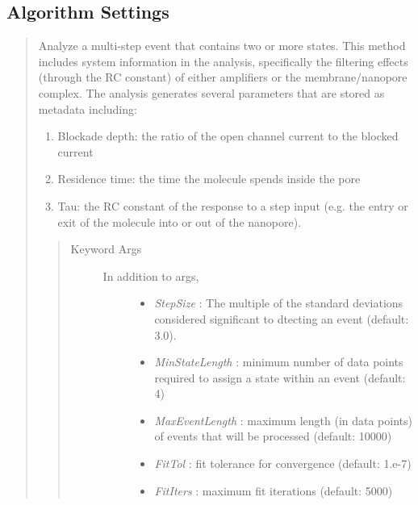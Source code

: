\documentclass[letterpaper,10pt,english]{sphinxmanual}
\begin{document}
\subsection{Algorithm Settings}
\label{doc/Algorithms:id3}\begin{quote}

Analyze a multi-step event that contains two or more states. This method includes system
information in the analysis, specifically the filtering effects (through the RC constant)
of either amplifiers or the membrane/nanopore complex. The analysis generates several
parameters that are stored as metadata including:
\begin{enumerate}
\item {} 
Blockade depth: the ratio of the open channel current to the blocked current

\item {} 
Residence time: the time the molecule spends inside the pore

\item {} 
Tau: the RC constant  of the response to a step input (e.g. the entry or exit of the molecule into or out of the nanopore).

\end{enumerate}
\begin{quote}\begin{description}
\item[{Keyword Args}] \leavevmode\begin{description}
\item[{In addition to {\hyperref[api\string-doc/mosaic.meta:mosaic.metaEventProcessor.metaEventProcessor]{\emph{}}} args,}] \leavevmode\begin{itemize}
\item {} 
\emph{StepSize} :                  The multiple of the standard deviations considered significant to dtecting an event (default: 3.0).

\item {} 
\emph{MinStateLength} :    minimum number of data points required to assign a state within an event (default: 4)

\item {} 
\emph{MaxEventLength} :    maximum length (in data points) of events that will be processed (default: 10000)

\item {} 
\emph{FitTol} :                    fit tolerance for convergence (default: 1.e-7)

\item {} 
\emph{FitIters} :                  maximum fit iterations (default: 5000)


\end{itemize}
\end{description}
\end{description}
\end{quote}
\end{quote}
\end{document}
